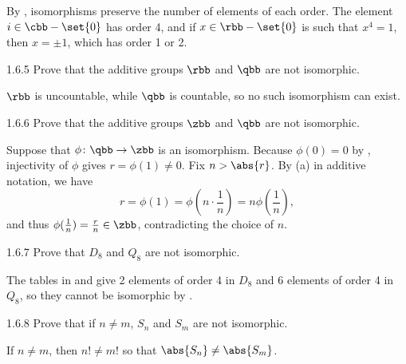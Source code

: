 \begin{sol}
    By , isomorphisms preserve the number of elements of each order.
    The element $i \in \cbb - \set{0}$ has order 4, and if $x \in \rbb - \set{0}$ is such that $x^4 = 1$, then $x = \pm 1$, which has order 1 or 2.
\end{sol}

\begin{exercise}{1.6.5}
    Prove that the additive groups $\rbb$ and $\qbb$ are not isomorphic.
\end{exercise}

\begin{sol}
    $\rbb$ is uncountable, while $\qbb$ is countable, so no such isomorphism can exist.
\end{sol}

\begin{exercise}{1.6.6}
    Prove that the additive groups $\zbb$ and $\qbb$ are not isomorphic.

\end{exercise}

\begin{sol}
    Suppose that $\phi \colon \qbb \to \zbb$ is an isomorphism.
    Because $\phi(0) = 0$ by , injectivity of $\phi$ gives $r = \phi(1) \neq 0$.
    Fix $n > \abs{r}$.
    By (a) in additive notation, we have
    \[
        r = \phi(1) = \phi\left(n \cdot \frac{1}{n}\right) = n \phi\left(\frac{1}{n}\right),
    \]
    and thus $\phi(\frac{1}{n}) = \frac{r}{n} \in \zbb$, contradicting the choice of $n$.
\end{sol}

\begin{exercise}{1.6.7}
    Prove that $D_8$ and $Q_8$ are not isomorphic.
\end{exercise}

\begin{sol}
    The tables in  and  give 2 elements of order 4 in $D_8$ and 6 elements of order 4 in $Q_8$, so they cannot be isomorphic by .
\end{sol}

\begin{exercise}{1.6.8}
    Prove that if $n \neq m$, $S_n$ and $S_m$ are not isomorphic.
\end{exercise}

\begin{sol}
    If $n \neq m$, then $n! \neq m!$ so that $\abs{S_n} \neq \abs{S_m}$.
\end{sol}

